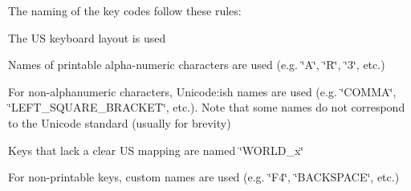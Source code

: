 The naming of the key codes follow these rules\+:
\begin{DoxyItemize}
\item The US keyboard layout is used
\item Names of printable alpha-\/numeric characters are used (e.\+g. \char`\"{}\+A\char`\"{}, \char`\"{}\+R\char`\"{}, \char`\"{}3\char`\"{}, etc.)
\item For non-\/alphanumeric characters, Unicode\+:ish names are used (e.\+g. \char`\"{}\+C\+O\+M\+M\+A\char`\"{}, \char`\"{}\+L\+E\+F\+T\+\_\+\+S\+Q\+U\+A\+R\+E\+\_\+\+B\+R\+A\+C\+K\+E\+T\char`\"{}, etc.). Note that some names do not correspond to the Unicode standard (usually for brevity)
\item Keys that lack a clear US mapping are named \char`\"{}\+W\+O\+R\+L\+D\+\_\+x\char`\"{}
\item For non-\/printable keys, custom names are used (e.\+g. \char`\"{}\+F4\char`\"{}, \char`\"{}\+B\+A\+C\+K\+S\+P\+A\+C\+E\char`\"{}, etc.) 
\end{DoxyItemize}